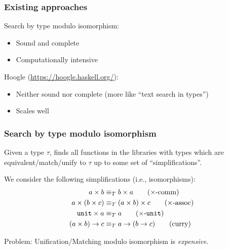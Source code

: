 \documentclass[aspectratio=169,dvipsnames,svgnames,10pt]{beamer}
\newcommand\Y{{\color{Green}{\ding{52}}}\xspace}
\newcommand\N{{\color{Red}{\ding{56}}}\xspace}
\begin{document}
\begin{frame}
  \frametitle{Existing approaches}

  {\large Search by type modulo isomorphism}:
  \begin{itemize}
  \item Sound and complete \Y
  \item Computationally intensive \N
  \end{itemize}

  \vfill

  {\large Hoogle} (\url{https://hoogle.haskell.org/}):
  \begin{itemize}
  \item Neither sound nor complete (more like ``text search in types'') \N
  \item Scales well \Y
  \end{itemize}
\end{frame}

\begin{frame}
  \frametitle{Search by type modulo isomorphism}

  Given a type $\tau$, finds all functions in the libraries with types which are equivalent/match/unify to $\tau$ up to some set of ``simplifications''.

  We consider the following simplifications (i.e., isomorphisms):
\begin{align}
    a \times b &\equiv_T
    b \times a
    \label{prod_comm}
    \tag{$\times$-comm}
  \\
    a \times (b \times c) &\equiv_T
    (a \times b) \times c
    \label{prod_assoc}
    \tag{$\times$-assoc}
  \\
    \texttt{unit} \times a &\equiv_T
    a
    \label{prod_unit}
    \tag{$\times$-$\texttt{unit}$}
  \\
    (a \times b) \rightarrow c &\equiv_T
    a \rightarrow (b \rightarrow c)
    \label{curry}
    \tag{curry}
\end{align}
  
  {\color{red} Problem}: Unification/Matching modulo isomorphism is \emph{expensive}.
\end{frame}
\end{document}
